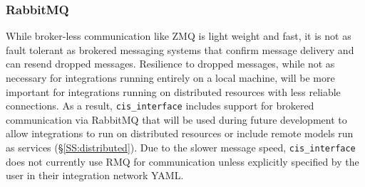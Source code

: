 \documentclass[journal]{IEEEtran}
\newcommand{\cis}{{\tt cis\_interface}{}}
\begin{document}
\subsubsection{RabbitMQ}\label{SSS:rmq}
%
While broker-less communication like ZMQ is light weight and fast, it is not as fault 
tolerant as brokered messaging systems that confirm message delivery and can resend 
dropped messages. Resilience to dropped messages, while not as necessary for integrations 
running entirely on a local machine, will be more important for integrations running on 
distributed resources with less reliable connections. As a result, {\cis} includes support 
for brokered communication via RabbitMQ \citep[RMQ][]{RMQ} that will be used during future 
development to allow integrations to run on distributed resources or include remote models 
run as services (\S\ref{SS:distributed}). Due to the slower message speed, 
{\cis} does not currently use RMQ for communication unless explicitly specified by the user in their 
integration network YAML. 

\end{document}
